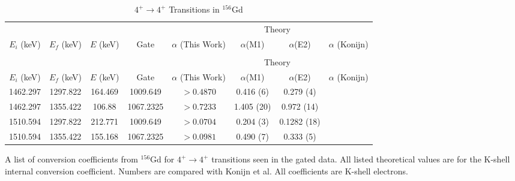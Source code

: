 \begin{landscape}
    \begin{longtable}{c|c|c|c|c|c|c|c}
        \caption{$4^+\rightarrow 4^+$ Transitions in $^{156}$Gd}
        \label{tab:156Gd_4_to_4}\\
        \toprule
        &	& 	&  &	& \multicolumn{2}{c|}{Theory}	& 	\\
        $E_i$ (keV)	&	$E_f$ (keV)	& $E$ (keV)	&	Gate &		$\alpha$ (This Work)	& $\alpha$(M1) & $\alpha$(E2) &	$\alpha$ (Konijn)	\\
        \hline
        \endfirsthead
        \toprule
        \caption[]{$4^+\rightarrow 4^+$ Transitions in $^{156}$Gd}\\
        &	& 	&  &	& \multicolumn{2}{c|}{Theory}	& 	\\
        $E_i$ (keV)	&	$E_f$ (keV)	& $E$ (keV)	&	Gate &		$\alpha$ (This Work)	& $\alpha$(M1) & $\alpha$(E2) &	$\alpha$ (Konijn)	\\
        \hline
	    \endhead
        1462.297 & 1297.822 & 164.469 & 1009.649 & $>0.4870$ & 0.416 (6) & 0.279 (4) & \\ \hline
        1462.297 & 1355.422 & 106.88 & 1067.2325 & $>0.7233$ & 1.405 (20) & 0.972 (14) & \\ \hline
        1510.594 & 1297.822 & 212.771 & 1009.649 & $>0.0704$  & 0.204 (3) & 0.1282 (18) & \\ \hline
        1510.594 & 1355.422 & 155.168 & 1067.2325 & $>0.0981$ & 0.490 (7) & 0.333 (5) &  \\
        \bottomrule
    \end{longtable}
    \caption{A list of conversion coefficients from $^{156}$Gd for $4^+\rightarrow 4^+$ transitions seen in the gated data. All listed theoretical values are for the K-shell internal conversion coefficient. Numbers are compared with Konijn et al. \citep{konjin81:_156gd} All coefficients are K-shell electrons.}
\end{landscape} 